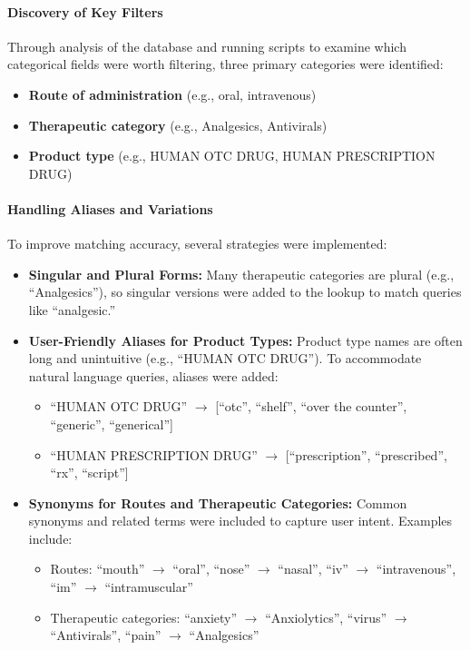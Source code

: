 \paragraph{Discovery of Key Filters}
Through analysis of the database and running scripts to examine which categorical fields were worth filtering, three primary categories were identified:
\begin{itemize}
    \item \textbf{Route of administration} (e.g., oral, intravenous)
    \item \textbf{Therapeutic category} (e.g., Analgesics, Antivirals)
    \item \textbf{Product type} (e.g., HUMAN OTC DRUG, HUMAN PRESCRIPTION DRUG)
\end{itemize}

\paragraph{Handling Aliases and Variations}
To improve matching accuracy, several strategies were implemented:

\begin{itemize}
    \item \textbf{Singular and Plural Forms:} Many therapeutic categories are plural (e.g., ``Analgesics''), so singular versions were added to the lookup to match queries like ``analgesic.''

    \item \textbf{User-Friendly Aliases for Product Types:} Product type names are often long and unintuitive (e.g., ``HUMAN OTC DRUG''). To accommodate natural language queries, aliases were added:
          \begin{itemize}
              \item ``HUMAN OTC DRUG'' $\to$ [``otc'', ``shelf'', ``over the counter'', ``generic'', ``generical'']
              \item ``HUMAN PRESCRIPTION DRUG'' $\to$ [``prescription'', ``prescribed'', ``rx'', ``script'']
          \end{itemize}

    \item \textbf{Synonyms for Routes and Therapeutic Categories:} Common synonyms and related terms were included to capture user intent. Examples include:
          \begin{itemize}
              \item Routes: ``mouth'' $\to$ ``oral'', ``nose'' $\to$ ``nasal'', ``iv'' $\to$ ``intravenous'', ``im'' $\to$ ``intramuscular''
              \item Therapeutic categories: ``anxiety'' $\to$ ``Anxiolytics'', ``virus'' $\to$ ``Antivirals'', ``pain'' $\to$ ``Analgesics''
          \end{itemize}
\end{itemize}

